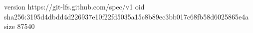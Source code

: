 version https://git-lfs.github.com/spec/v1
oid sha256:3195d4dbdd4d226937e10f22fd5035a15c8b89ec3bb017c68fb58d6025865e4a
size 87540
